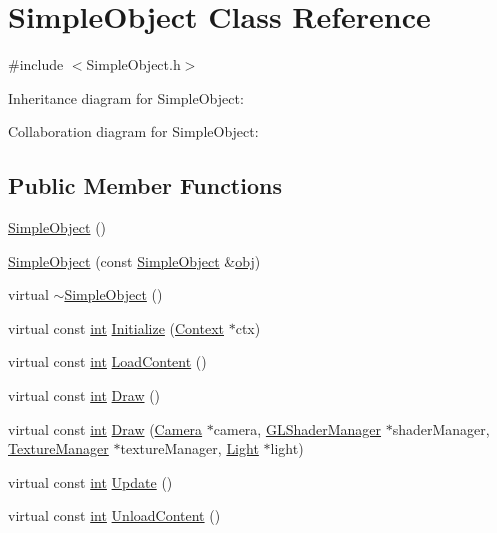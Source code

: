 \hypertarget{class_simple_object}{\section{Simple\-Object Class Reference}
\label{class_simple_object}
}


{\ttfamily \#include $<$Simple\-Object.\-h$>$}



Inheritance diagram for Simple\-Object\-:


Collaboration diagram for Simple\-Object\-:
\subsection*{Public Member Functions}
\begin{DoxyCompactItemize}
\item 
\hyperlink{class_simple_object_ac896d1529367b4a17367018a172b5867}{Simple\-Object} ()
\item 
\hyperlink{class_simple_object_a05d8f5dc9883812fe3779f3639e7cdac}{Simple\-Object} (const \hyperlink{class_simple_object}{Simple\-Object} \&\hyperlink{_g_l_e_w_2glew_8h_a0c0d4701a6c89f4f7f0640715d27ab26}{obj})
\item 
virtual \hyperlink{class_simple_object_aa4223f47628fe1849cb2bc3d0afa289c}{$\sim$\-Simple\-Object} ()
\item 
virtual const \hyperlink{_s_d_l__thread_8h_a6a64f9be4433e4de6e2f2f548cf3c08e}{int} \hyperlink{class_simple_object_ad8cab013f221a2b7132dc243a304b20f}{Initialize} (\hyperlink{class_context}{Context} $\ast$ctx)
\item 
virtual const \hyperlink{_s_d_l__thread_8h_a6a64f9be4433e4de6e2f2f548cf3c08e}{int} \hyperlink{class_simple_object_ae06adca212a0d4bf4607b324908b2b8e}{Load\-Content} ()
\item 
virtual const \hyperlink{_s_d_l__thread_8h_a6a64f9be4433e4de6e2f2f548cf3c08e}{int} \hyperlink{class_simple_object_a153209a7b59e36afec7d555708700a25}{Draw} ()
\item 
virtual const \hyperlink{_s_d_l__thread_8h_a6a64f9be4433e4de6e2f2f548cf3c08e}{int} \hyperlink{class_simple_object_ac4a7b3ff3c2215ff68b3967b57c77fa9}{Draw} (\hyperlink{class_camera}{Camera} $\ast$camera, \hyperlink{class_g_l_shader_manager}{G\-L\-Shader\-Manager} $\ast$shader\-Manager, \hyperlink{class_texture_manager}{Texture\-Manager} $\ast$texture\-Manager, \hyperlink{class_light}{Light} $\ast$light)
\item 
virtual const \hyperlink{_s_d_l__thread_8h_a6a64f9be4433e4de6e2f2f548cf3c08e}{int} \hyperlink{class_simple_object_a7523273ddea5901d2049575229c8b5ca}{Update} ()
\item 
virtual const \hyperlink{_s_d_l__thread_8h_a6a64f9be4433e4de6e2f2f548cf3c08e}{int} \hyperlink{class_simple_object_a5fe4d692b6633f2c68b6eae1d3f6b059}{Unload\-Content} ()
\end{DoxyCompactItemize}
